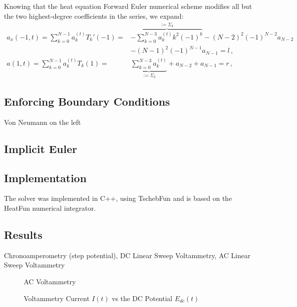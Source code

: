 \documentclass{prettytex/ox/mmsc-special-topic}
\begin{document}
  Knowing that the heat equation Forward Euler numerical scheme modifies all but the two highest-degree coefficients in the series, we expand:
  \begin{align*}
    a_x(-1, t) = \sum_{k=0}^{N-1} a_k^{(t)} T_k'(-1) =   & \overbrace{-\sum_{k=0}^{N-3} a_k^{(t)} k^2 (-1)^{k}}^{:= \Sigma_3} - (N-2)^2 (-1)^{N-2} a_{N-2}                  \\
                                                         & -(N-1)^2 (-1)^{N-1} a_{N-1} = l\,,                                                                               \\
    a(1, t)    = \sum_{k=0}^{N-1} a_k^{(t)} T_k(1)     = & \underbrace{\sum_{k=0}^{N-3} a_k^{(t)}}_{:= \Sigma_2}              + a_{N-2}                    + a_{N-1} = r\,,
  \end{align*}

  \subsection{Enforcing Boundary Conditions}
  Von Neumann on the left

  \subsection{Implicit Euler}

  \subsection{Implementation}
  The solver was implemented in C++, using TschebFun and is based on the HeatFun numerical integrator.


  \subsection{Results}
  Chronoamperometry (step potential),
  DC Linear Sweep Voltammetry,
  AC Linear Sweep Voltammetry

  \begin{figure}[H]
    \centering
    \caption{AC Voltammetry}
    \label{fig:ac-voltammetry}
  \end{figure}

  \begin{figure}[H]
    \centering
    \caption{Voltammetry Current $I(t)$ vs the DC Potential $E_{dc}(t)$}
    \label{fig:different-E0s}
  \end{figure}
\end{document}
